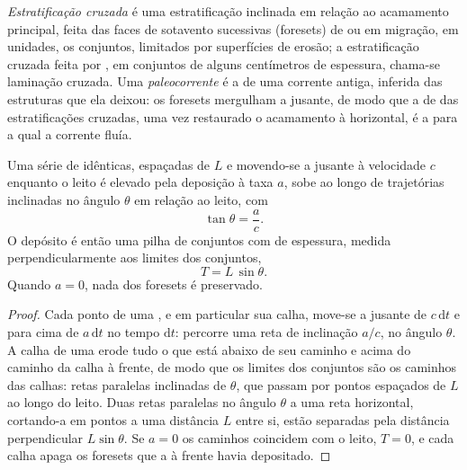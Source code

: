 \begin{definition}\label{def:b1:clastic-sediments:cross-bedding}
\emph{Estratificação cruzada} é uma estratificação inclinada em relação ao acamamento principal, feita das faces de sotavento sucessivas (foresets) de  ou  em migração, em unidades, os conjuntos, limitados por superfícies de erosão; a estratificação cruzada feita por , em conjuntos de alguns centímetros de espessura, chama-se laminação cruzada. Uma \emph{paleocorrente} é a  de uma corrente antiga, inferida das estruturas que ela deixou: os foresets mergulham a jusante, de modo que a  de  das estratificações cruzadas, uma vez restaurado o acamamento à horizontal, é a  para a qual a corrente fluía.
\end{definition}

\begin{proposition}\label{prop:b1:clastic-sediments:climb}
Uma série de  idênticas, espaçadas de $L$ e movendo-se a jusante à velocidade $c$ enquanto o leito é elevado pela deposição à taxa $a$, sobe ao longo de trajetórias inclinadas no ângulo $\theta$ em relação ao leito, com
\[
  \tan\theta = \frac{a}{c}.
\]
O depósito é então uma pilha de conjuntos com  de espessura, medida perpendicularmente aos limites dos conjuntos,
\[
  T = L\,\sin\theta .
\]
Quando $a = 0$, nada dos foresets é preservado.
\end{proposition}

\begin{proof}
Cada ponto de uma , e em particular sua calha, move-se a jusante de $c\,\mathrm dt$ e para cima de $a\,\mathrm dt$ no tempo $\mathrm dt$: percorre uma reta de inclinação $a/c$, no ângulo $\theta$. A calha de uma  erode tudo o que está abaixo de seu caminho e acima do caminho da calha à frente, de modo que os limites dos conjuntos são os caminhos das calhas: retas paralelas inclinadas de $\theta$, que passam por pontos espaçados de $L$ ao longo do leito. Duas retas paralelas no ângulo $\theta$ a uma reta horizontal, cortando-a em pontos a uma distância $L$ entre si, estão separadas pela distância perpendicular $L\sin\theta$. Se $a = 0$ os caminhos coincidem com o leito, $T = 0$, e cada calha apaga os foresets que a  à frente havia depositado.
\end{proof}

